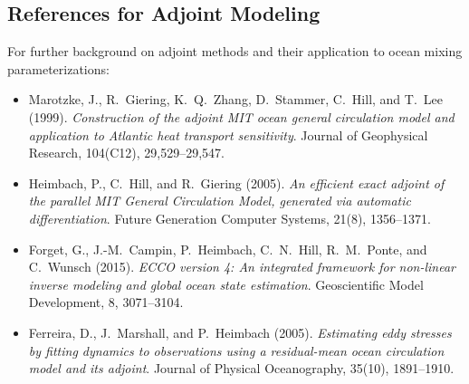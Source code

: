 \documentclass[12pt,letterpaper]{article}
\begin{document}
\subsection{References for Adjoint Modeling}

For further background on adjoint methods and their application to ocean mixing
parameterizations:

\begin{itemize}[leftmargin=*]
  \item Marotzke, J., R.\ Giering, K.\ Q.\ Zhang, D.\ Stammer, C.\ Hill, and T.\ Lee (1999).
        \textit{Construction of the adjoint MIT ocean general circulation model and
        application to Atlantic heat transport sensitivity}. Journal of Geophysical
        Research, 104(C12), 29,529--29,547.

  \item Heimbach, P., C.\ Hill, and R.\ Giering (2005).
        \textit{An efficient exact adjoint of the parallel MIT General Circulation Model,
        generated via automatic differentiation}. Future Generation Computer Systems,
        21(8), 1356--1371.

  \item Forget, G., J.-M.\ Campin, P.\ Heimbach, C.\ N.\ Hill, R.\ M.\ Ponte, and C.\ Wunsch (2015).
        \textit{ECCO version 4: An integrated framework for non-linear inverse modeling
        and global ocean state estimation}. Geoscientific Model Development, 8, 3071--3104.

  \item Ferreira, D., J.\ Marshall, and P.\ Heimbach (2005).
        \textit{Estimating eddy stresses by fitting dynamics to observations using a
        residual-mean ocean circulation model and its adjoint}. Journal of Physical
        Oceanography, 35(10), 1891--1910.
\end{itemize}

  
\end{document}
